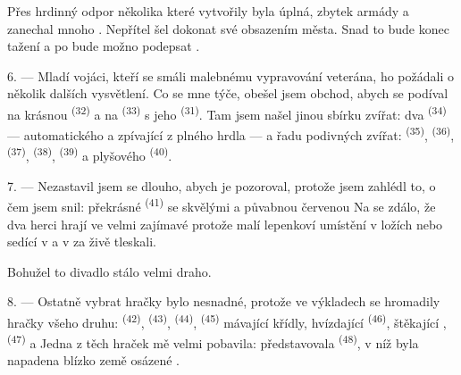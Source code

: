 Přes hrdinný odpor několika  které vytvořily  byla
 úplná, zbytek armády  a zanechal mnoho .
Nepřítel šel dokonat své  obsazením města. Snad to bude konec tažení a po
 bude možno podepsat .

\VUsaut{4.4mm}
\VUsaut{2.8mm}

6. --- Mladí vojáci, kteří se smáli malebnému vypravování veterána, ho požádali o několik
dalších vysvětlení. Co se mne týče, obešel jsem obchod, abych se podíval na krásnou
 \textsuperscript{(32)} a na  \textsuperscript{(33)} s jeho
 \textsuperscript{(31)}. Tam jsem našel jinou sbírku zvířat: dva
 \textsuperscript{(34)} --- automatického  a
 zpívající z plného hrdla --- a řadu podivných zvířat:
 \textsuperscript{(35)},  \textsuperscript{(36)},
 \textsuperscript{(37)},  \textsuperscript{(38)},
 \textsuperscript{(39)} a plyšového 
\textsuperscript{(40)}.

7. --- Nezastavil jsem se dlouho, abych je pozoroval, protože jsem zahlédl to, o čem jsem
snil: překrásné  \textsuperscript{(41)} se skvělými
 a půvabnou červenou  Na  se zdálo,
že dva herci hrají  ve velmi zajímavé  protože malí lepenkoví
 umístění v ložích nebo sedící v  a v 
za  živě tleskali.

Bohužel to divadlo stálo velmi draho.

8. --- Ostatně vybrat hračky bylo nesnadné, protože ve výkladech se hromadily hračky všeho
druhu:  \textsuperscript{(42)},  \textsuperscript{(43)},
 \textsuperscript{(44)},  \textsuperscript{(45)} mávající křídly,
hvízdající  \textsuperscript{(46)}, štěkající , 
\textsuperscript{(47)} a  Jedna z těch hraček mě velmi pobavila:
představovala  \textsuperscript{(48)}, v níž byla
 napadena  blízko země osázené .


